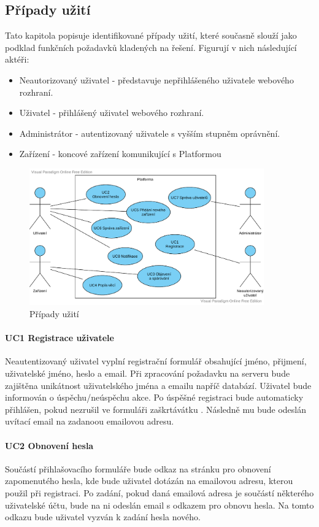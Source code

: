 \subsection{Případy užití}
Tato kapitola popisuje identifikované případy užití, které současně slouží jako podklad funkčních požadavků kladených na řešení. Figurují v nich následující aktéři:
\begin{itemize}
    \item Neautorizovaný uživatel - představuje nepřihlášeného uživatele webového rozhraní.
    \item Uživatel - přihlášený uživatel webového rozhraní.
    \item Administrátor - autentizovaný uživatele s vyšším stupněm oprávnění.
    \item Zařízení - koncové zařízení komunikující s Platformou
\end{itemize}

\begin{figure}[htbp]
    \centering
    \includegraphics[width=0.9\textwidth]{img/use_case.pdf}
    \caption{Případy užití}
\end{figure}

\paragraph{UC1 Registrace uživatele}
Neautentizovaný uživatel vyplní registrační formulář obsahující jméno, přijmení, uživatelské jméno, heslo a email. Při zpracování požadavku na serveru bude zajištěna unikátnost uživatelského jména a emailu napříč databází. Uživatel bude informován o úspěchu/neúspěchu akce. Po úspěšné registraci bude automaticky přihlášen, pokud nezrušil ve formuláři zaškrtávátku . Následně mu bude odeslán uvítací email na zadanoou emailovou adresu.

\paragraph{UC2 Obnovení hesla}
Součástí přihlašovacího formuláře bude odkaz na stránku pro obnovení zapomenutého hesla, kde bude uživatel dotázán na emailovou adresu, kterou použil při registraci. Po zadání, pokud daná emailová adresa je součástí některého uživatelské účtu, bude na ni odeslán email s odkazem pro obnovu hesla. Na tomto odkazu bude uživatel vyzván k zadání hesla nového.

